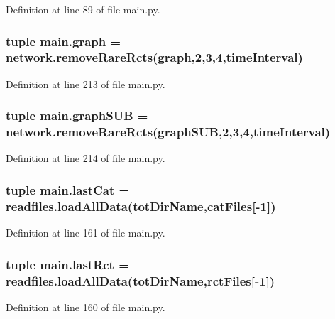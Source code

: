 Definition at line 89 of file main.\-py.

\hypertarget{a00122_a4cfdc01ecc5ad260a4f30c9353e3d856}{
\subsubsection[{graph}]{\setlength{\rightskip}{0pt plus 5cm}tuple main.\-graph = network.\-remove\-Rare\-Rcts(graph,2,3,4,{\bf time\-Interval})}}\label{a00122_a4cfdc01ecc5ad260a4f30c9353e3d856}


Definition at line 213 of file main.\-py.

\hypertarget{a00122_ab96de87bc8cbe59221256af996bdc43e}{
\subsubsection[{graph\-S\-U\-B}]{\setlength{\rightskip}{0pt plus 5cm}tuple main.\-graph\-S\-U\-B = network.\-remove\-Rare\-Rcts(graph\-S\-U\-B,2,3,4,{\bf time\-Interval})}}\label{a00122_ab96de87bc8cbe59221256af996bdc43e}


Definition at line 214 of file main.\-py.

\hypertarget{a00122_a1d69cc4251d83bb227555044baf27b86}{
\subsubsection[{last\-Cat}]{\setlength{\rightskip}{0pt plus 5cm}tuple main.\-last\-Cat = readfiles.\-load\-All\-Data({\bf tot\-Dir\-Name},{\bf cat\-Files}\mbox{[}-\/1\mbox{]})}}\label{a00122_a1d69cc4251d83bb227555044baf27b86}


Definition at line 161 of file main.\-py.

\hypertarget{a00122_ad9cee9fada504bb0dab86df3a416232b}{
\subsubsection[{last\-Rct}]{\setlength{\rightskip}{0pt plus 5cm}tuple main.\-last\-Rct = readfiles.\-load\-All\-Data({\bf tot\-Dir\-Name},{\bf rct\-Files}\mbox{[}-\/1\mbox{]})}}\label{a00122_ad9cee9fada504bb0dab86df3a416232b}


Definition at line 160 of file main.\-py.

